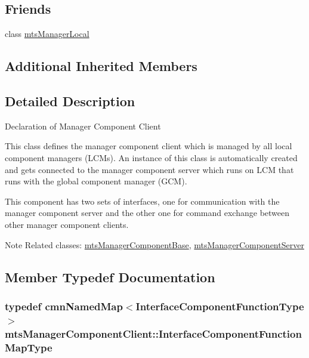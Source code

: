 \subsection*{Friends}
\begin{DoxyCompactItemize}
\item 
class \hyperlink{classmts_manager_component_client_a31c1c611dbb103ac58ed40d84960baa0}{mts\+Manager\+Local}
\end{DoxyCompactItemize}
\subsection*{Additional Inherited Members}


\subsection{Detailed Description}
Declaration of Manager Component Client

This class defines the manager component client which is managed by all local component managers (L\+C\+Ms). An instance of this class is automatically created and gets connected to the manager component server which runs on L\+C\+M that runs with the global component manager (G\+C\+M). 

This component has two sets of interfaces, one for communication with the manager component server and the other one for command exchange between other manager component clients.

\begin{DoxyNote}{Note}
Related classes\+: \hyperlink{classmts_manager_component_base}{mts\+Manager\+Component\+Base}, \hyperlink{classmts_manager_component_server}{mts\+Manager\+Component\+Server} 
\end{DoxyNote}


\subsection{Member Typedef Documentation}
\hypertarget{classmts_manager_component_client_a6f0f9dde52834d02169c3b1feda1cab5}{}
\subsubsection[{Interface\+Component\+Function\+Map\+Type}]{\setlength{\rightskip}{0pt plus 5cm}typedef {\bf cmn\+Named\+Map}$<${\bf Interface\+Component\+Function\+Type}$>$ {\bf mts\+Manager\+Component\+Client\+::\+Interface\+Component\+Function\+Map\+Type}\hspace{0.3cm}{\ttfamily [protected]}}\label{classmts_manager_component_client_a6f0f9dde52834d02169c3b1feda1cab5}


